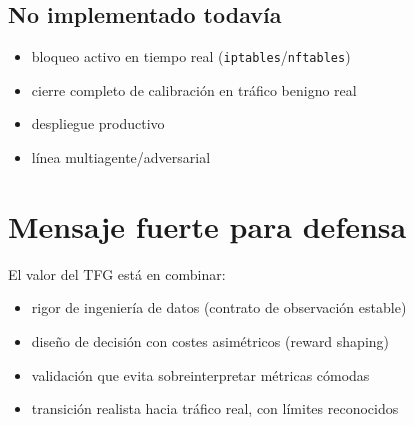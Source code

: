 ﻿\documentclass[12pt,a4paper]{article}
\begin{document}
\subsection{No implementado todavía}

\begin{itemize}
  \item bloqueo activo en tiempo real (\verb|iptables|/\verb|nftables|)
  \item cierre completo de calibración en tráfico benigno real
  \item despliegue productivo
  \item línea multiagente/adversarial
\end{itemize}

\section{Mensaje fuerte para defensa}

El valor del TFG está en combinar:

\begin{itemize}
  \item rigor de ingeniería de datos (contrato de observación estable)
  \item diseño de decisión con costes asimétricos (reward shaping)
  \item validación que evita sobreinterpretar métricas cómodas
  \item transición realista hacia tráfico real, con límites reconocidos
\end{itemize}
\end{document}
